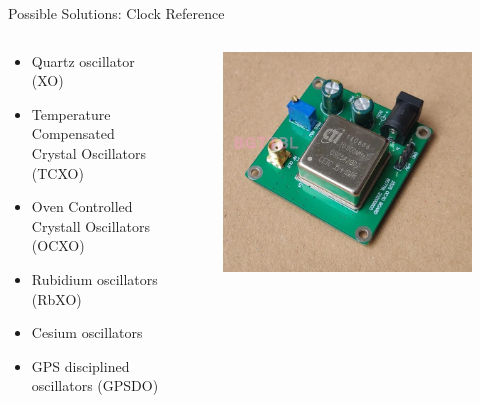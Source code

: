 \begin{frame}{Possible Solutions: Clock Reference}

    \begin{columns}[t]
        \begin{column}[t]{0.65\textwidth}
            \begin{itemize}
                \item Quartz oscillator (XO)
                \vspace{0.1cm}
                \item Temperature Compensated Crystal Oscillators (TCXO)
                \vspace{0.1cm}
                \item Oven Controlled Crystall Oscillators (OCXO)
                \vspace{0.1cm}
                \item Rubidium oscillators (RbXO)
                \vspace{0.1cm}
                \item Cesium oscillators
                \vspace{0.1cm}
                \item GPS disciplined oscillators (GPSDO)
            \end{itemize}
        \end{column}
        \begin{column}[t]{0.4\textwidth}
            \begin{figure}[!ht]
                \begin{center}
                    \includegraphics[width=0.8\columnwidth]{figures/ex-ocxo}
                \end{center}
            \end{figure}


\end{column}
\end{columns}
\end{frame}
